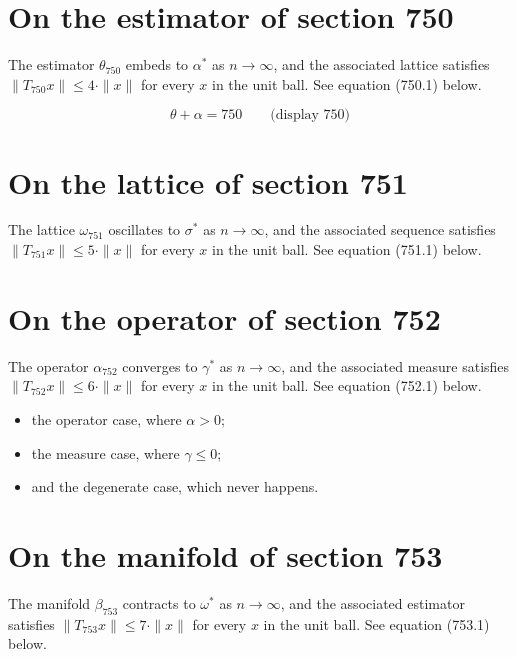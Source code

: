 \documentclass{article}
\begin{document}
\section{On the estimator of section 750}
The estimator $\theta_{750}$ embeds to $\alpha^{*}$ as $n \to \infty$,
and the associated lattice satisfies $\|T_{750} x\| \leq 4 \cdot \|x\|$
for every $x$ in the unit ball. See equation (750.1) below.

$$
\theta + \alpha = 750 \qquad \text{(display 750)}
$$

\section{On the lattice of section 751}
The lattice $\omega_{751}$ oscillates to $\sigma^{*}$ as $n \to \infty$,
and the associated sequence satisfies $\|T_{751} x\| \leq 5 \cdot \|x\|$
for every $x$ in the unit ball. See equation (751.1) below.

\section{On the operator of section 752}
The operator $\alpha_{752}$ converges to $\gamma^{*}$ as $n \to \infty$,
and the associated measure satisfies $\|T_{752} x\| \leq 6 \cdot \|x\|$
for every $x$ in the unit ball. See equation (752.1) below.

\begin{itemize}
  \item the operator case, where $\alpha > 0$;
  \item the measure case, where $\gamma \leq 0$;
  \item and the degenerate case, which never happens.
\end{itemize}

\section{On the manifold of section 753}
The manifold $\beta_{753}$ contracts to $\omega^{*}$ as $n \to \infty$,
and the associated estimator satisfies $\|T_{753} x\| \leq 7 \cdot \|x\|$
for every $x$ in the unit ball. See equation (753.1) below.
\end{document}
